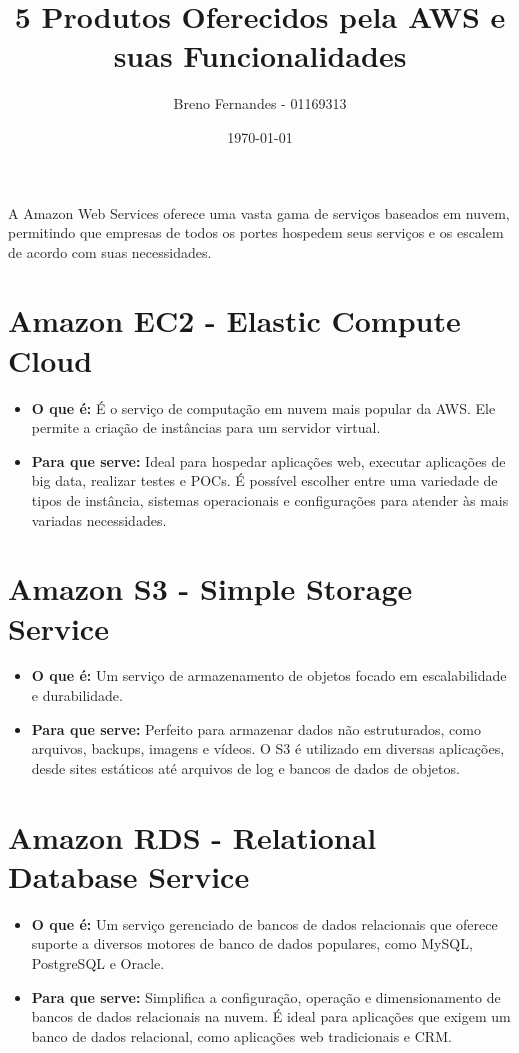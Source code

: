 \documentclass[a4paper,12pt]{article}
\title{5 Produtos Oferecidos pela AWS e suas Funcionalidades}
\author{Breno Fernandes - 01169313}
\date{\today}
\begin{document}
\maketitle

A Amazon Web Services oferece uma vasta gama de serviços baseados em nuvem, permitindo que empresas de todos os portes hospedem seus serviços e os escalem de acordo com suas necessidades.

\section*{Amazon EC2 - Elastic Compute Cloud}
\begin{itemize}[left=0pt]
    \item \textbf{O que é:} É o serviço de computação em nuvem mais popular da AWS. Ele permite a criação de instâncias para um servidor virtual.
    \item \textbf{Para que serve:} Ideal para hospedar aplicações web, executar aplicações de big data, realizar testes e POCs. É possível escolher entre uma variedade de tipos de instância, sistemas operacionais e configurações para atender às mais variadas necessidades.
\end{itemize}

\section*{Amazon S3 - Simple Storage Service}
\begin{itemize}[left=0pt]
    \item \textbf{O que é:} Um serviço de armazenamento de objetos focado em escalabilidade e durabilidade.
    \item \textbf{Para que serve:} Perfeito para armazenar dados não estruturados, como arquivos, backups, imagens e vídeos. O S3 é utilizado em diversas aplicações, desde sites estáticos até arquivos de log e bancos de dados de objetos.
\end{itemize}

\section*{Amazon RDS - Relational Database Service}
\begin{itemize}[left=0pt]
    \item \textbf{O que é:} Um serviço gerenciado de bancos de dados relacionais que oferece suporte a diversos motores de banco de dados populares, como MySQL, PostgreSQL e Oracle.
    \item \textbf{Para que serve:} Simplifica a configuração, operação e dimensionamento de bancos de dados relacionais na nuvem. É ideal para aplicações que exigem um banco de dados relacional, como aplicações web tradicionais e CRM.
\end{itemize}
\end{document}
